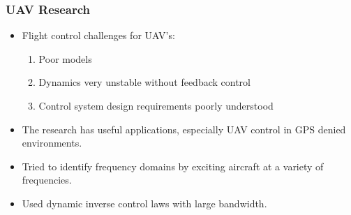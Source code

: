 \documentclass{article}
\begin{document}
\subsubsection{UAV Research}
\begin{itemize}
\item Flight control challenges for UAV's: 
\begin{enumerate}
\item Poor models
\item Dynamics very unstable without feedback control
\item Control system design requirements poorly understood
\end{enumerate}
\item The research has useful applications, especially UAV control in GPS denied environments. 
\item Tried to identify frequency domains by exciting aircraft at a variety of frequencies.
\item Used dynamic inverse control laws with large bandwidth.
\end{itemize}
    
    
    
    
\end{document}
